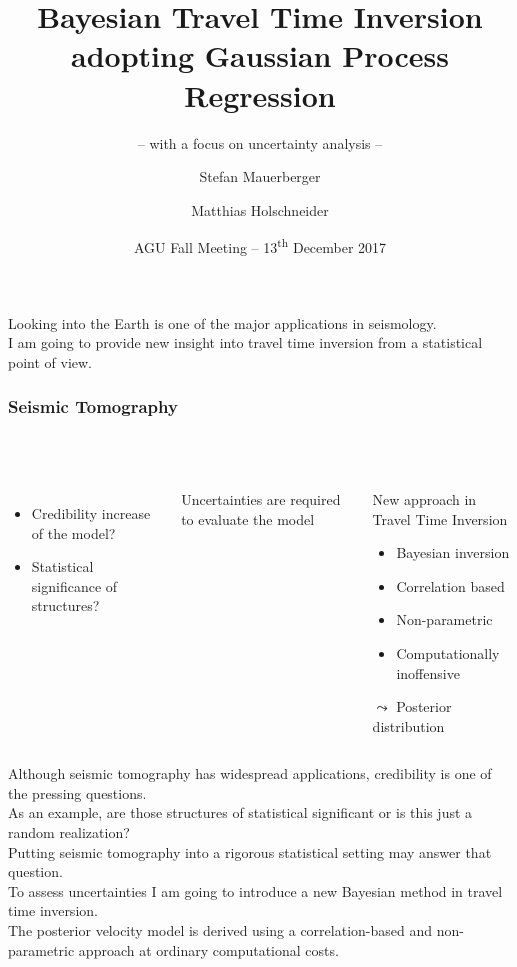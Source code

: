 \documentclass[aspectratio=169, t, 10pt,
    ]{beamer}
\title[Correlation based travel time inversion]{Bayesian Travel Time Inversion adopting Gaussian Process Regression}
\subtitle{-- with a focus on uncertainty analysis --}
\author[\tt mauerber@uni-potsdam.de]{Stefan Mauerberger \and Matthias Holschneider}
\institute[Math@UP]{University Potsdam, Institute of Mathematics}
\date[AGU~2017]{AGU Fall Meeting -- 13\textsuperscript{th} December 2017}
\begin{document}

Looking into the Earth is one of the major applications in seismology.
\\
I am going to provide new insight into travel time inversion from a statistical point of view.


\begin{frame}
    \frametitle{Seismic Tomography}
    \framesubtitle{~}%
%
\begin{columns}%
%
%
    \begin{itemize}
        \item Credibility increase of the model?
        \item Statistical significance of structures?
    \end{itemize}

    \begin{center}
        \large Uncertainties are required to evaluate the model
    \end{center}

    \begin{exampleblock}{New approach in Travel Time Inversion}
    \begin{itemize}
        \item Bayesian inversion
        \item Correlation based
        \item Non-parametric
        \item Computationally inoffensive
    \end{itemize}
    \hfill {\large$\leadsto$} Posterior distribution ~
    \end{exampleblock}

    \vspace{-10mm}
    
\end{columns}

\end{frame}


Although seismic tomography has widespread applications, credibility is one of the pressing questions.
\\
As an example, are those structures of statistical significant or is this just a random realization?
\\[2mm]

Putting seismic tomography into a rigorous statistical setting may answer that question.
\\
To assess uncertainties I am going to introduce a new Bayesian method in travel time inversion.
\\
The posterior velocity model is derived using a correlation-based and non-parametric approach at ordinary computational costs.
\end{document}
